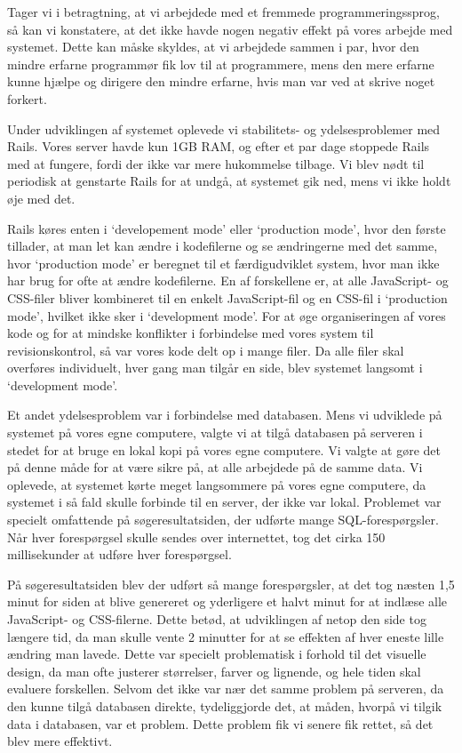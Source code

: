 Tager vi i betragtning, at vi arbejdede med et fremmede programmeringssprog, så kan vi konstatere, at det ikke havde nogen negativ effekt på vores arbejde med systemet. Dette kan måske skyldes, at vi arbejdede sammen i par, hvor den mindre erfarne programmør fik lov til at programmere, mens den mere erfarne kunne hjælpe og dirigere den mindre erfarne, hvis man var ved at skrive noget forkert.

Under udviklingen af systemet oplevede vi stabilitets- og ydelsesproblemer med Rails. Vores server havde kun 1GB RAM, og efter et par dage stoppede Rails med at fungere, fordi der ikke var mere hukommelse tilbage. Vi blev nødt til periodisk at genstarte Rails for at undgå, at systemet gik ned, mens vi ikke holdt øje med det.

Rails køres enten i `developement mode' eller `production mode', hvor den første tillader, at man let kan ændre i kodefilerne og se ændringerne med det samme, hvor `production mode' er beregnet til et færdigudviklet system, hvor man ikke har brug for ofte at ændre kodefilerne. En af forskellene er, at alle JavaScript- og CSS-filer bliver kombineret til en enkelt JavaScript-fil og en CSS-fil i `production mode', hvilket ikke sker i `development mode'. For at øge organiseringen af vores kode og for at mindske konflikter i forbindelse med vores system til revisionskontrol, så var vores kode delt op i mange filer. Da alle filer skal overføres individuelt, hver gang man tilgår en side, blev systemet langsomt i `development mode'.

Et andet ydelsesproblem var i forbindelse med databasen. Mens vi udviklede på systemet på vores egne computere, valgte vi at tilgå databasen på serveren i stedet for at bruge en lokal kopi på vores egne computere. Vi valgte at gøre det på denne måde for at være sikre på, at alle arbejdede på de samme data. Vi oplevede, at systemet kørte meget langsommere på vores egne computere, da systemet i så fald skulle forbinde til en server, der ikke var lokal. Problemet var specielt omfattende på søgeresultatsiden, der udførte mange SQL-forespørgsler. Når hver forespørgsel skulle sendes over internettet, tog det cirka 150 millisekunder at udføre hver forespørgsel.

På søgeresultatsiden blev der udført så mange forespørgsler, at det tog næsten 1,5 minut for siden at blive genereret og yderligere et halvt minut for at indlæse alle JavaScript- og CSS-filerne. Dette betød, at udviklingen af netop den side tog længere tid, da man skulle vente 2 minutter for at se effekten af hver eneste lille ændring man lavede. Dette var specielt problematisk i forhold til det visuelle design, da man ofte justerer størrelser, farver og lignende, og hele tiden skal evaluere forskellen. Selvom det ikke var nær det samme problem på serveren, da den kunne tilgå databasen direkte, tydeliggjorde det, at måden, hvorpå vi tilgik data i databasen, var et problem. Dette problem fik vi senere fik rettet, så det blev mere effektivt.


